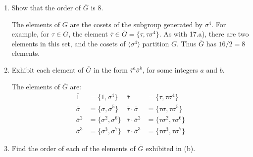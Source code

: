 \documentclass{article}
\begin{document}
\begin{enumerate}[label=(\alph*), itemsep=0em]
    \item Show that the order of $\overline{G}$ is 8.

          The elements of $\overline{G}$ are the cosets of the subgroup generated by $\sigma^4$. For example, for $\tau \in G$, the element $\overline{\tau} \in \overline{G} = \{ \tau, \tau \sigma^4 \}$. As with 17.a), there are two elements in this set, and the cosets of $\langle \sigma^4 \rangle$ partition $G$. Thus $\overline{G}$ has $16/2 = 8$ elements.
    \item Exhibit each element of $\overline{G}$ in the form $\overline{\tau}^a \overline{\sigma}^b$, for some integers $a$ and $b$.

          The elements of $\overline{G}$ are:
          \begin{align*}
            \overline{1} &= \{ 1, \sigma^4 \} & \overline{\tau} &= \{ \tau, \tau\sigma^4 \} \\ 
            \overline{\sigma} &= \{ \sigma, \sigma^5 \} & \overline{\tau}\cdot\overline{\sigma} &= \{ \tau\sigma, \tau\sigma^5 \} \\
            \overline{\sigma}^2 &= \{ \sigma^2, \sigma^6 \} & \overline{\tau}\cdot\overline{\sigma}^2 &= \{ \tau\sigma^2, \tau\sigma^6 \} \\
            \overline{\sigma}^3 &= \{ \sigma^3, \sigma^7 \} & \overline{\tau}\cdot\overline{\sigma}^3 &= \{ \tau\sigma^3, \tau\sigma^7 \}
          \end{align*}
    \item Find the order of each of the elements of $\overline{G}$ exhibited in (b).


\end{enumerate}
\end{document}
